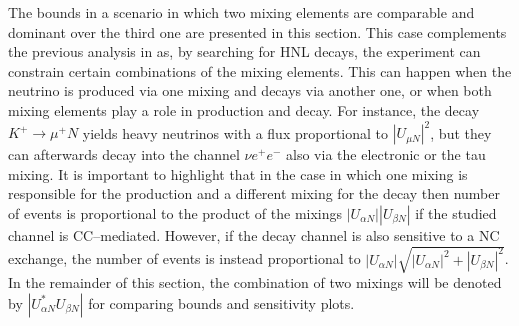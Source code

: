 The bounds in a scenario in which two mixing elements are comparable and dominant over the third one are presented in this section.
This case complements the previous analysis in  as, by searching for HNL decays, %
the experiment can constrain certain combinations of the mixing elements.
This can happen when the neutrino is produced via one mixing and decays via another one, %
or when both mixing elements play a role in production and decay.
For instance, the decay $K^+ \to \mu^+ N$ yields heavy neutrinos with a flux proportional to %
$|U_{\mu N}|^2$, but they can afterwards decay into the channel $\nu e^+ e^-$ also via the electronic or the tau mixing.
It is important to highlight that in the case in which one mixing is responsible %
for the production and a different mixing for the decay %
then number of events is proportional to the product of the mixings %
$|U_{\alpha N}||U_{\beta N}|$ if the studied channel is CC--mediated.
However, if the decay channel is also sensitive to a NC exchange, the number of events is instead proportional to %
$|U_{\alpha N}|\sqrt{|U_{\alpha N}|^2 + |U_{\beta N}|^2}$.
In the remainder of this section, the combination of two mixings will be denoted by $|U_{\alpha N}^* U_{\beta N}|$ %
for comparing bounds and sensitivity plots.

